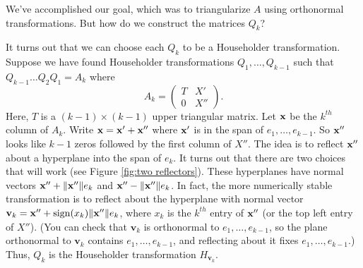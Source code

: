 We've accomplished our goal, which was to triangularize $A$ using orthonormal transformations.
But how do we construct the matrices $Q_k$?

It turns out that we can choose each $Q_k$ to be a Householder transformation. 
Suppose we have found Householder transformations $Q_1, \ldots, Q_{k-1}$ such that $Q_{k-1}\ldots Q_2Q_1 = A_k$ where 
\[
A_k = \begin{pmatrix}
T & X' \\
0 & X''
\end{pmatrix}.
\]
Here, $T$ is a $(k-1) \times (k-1)$ upper triangular matrix. 
Let ${\bf x}$ be the $k^{th}$ column of $A_k$. 
Write ${\bf x} = {\bf x}' + {\bf x}''$ where ${\bf x}'$ is in the span of $e_1, \ldots, e_{k-1}$. 
So ${\bf x}''$ looks like $k-1$ zeros followed by the first column of $X''$. 
The idea is to reflect ${\bf x}''$ about a hyperplane into the span of $e_k$. 
It turns out that there are two choices that will work (see Figure \ref{fig:two reflectors}). 
These hyperplanes have normal vectors ${\bf x}'' + \| {\bf x}'' \|e_k$ and ${\bf x}'' - \| {\bf x}'' \|e_k$.
In fact, the more numerically stable transformation is to reflect about the hyperplane with normal vector $\mathbf{v}_k = {\bf x}'' +\operatorname{sign}(x_k) \| {\bf x}'' \|e_k$, where $x_k$ is the $k^{th}$ entry of ${\bf x}''$ (or the top left entry of $X''$). 
(You can check that $\mathbf{v}_k$ is orthonormal to $e_1, \ldots, e_{k-1}$, so the plane orthonormal to $\mathbf{v}_k$ contains $e_1, \ldots, e_{k-1}$, and reflecting about it fixes $e_1, \ldots, e_{k-1}$.)
Thus, $Q_k$ is the Householder transformation $H_{\mathbf{v}_k}$.

